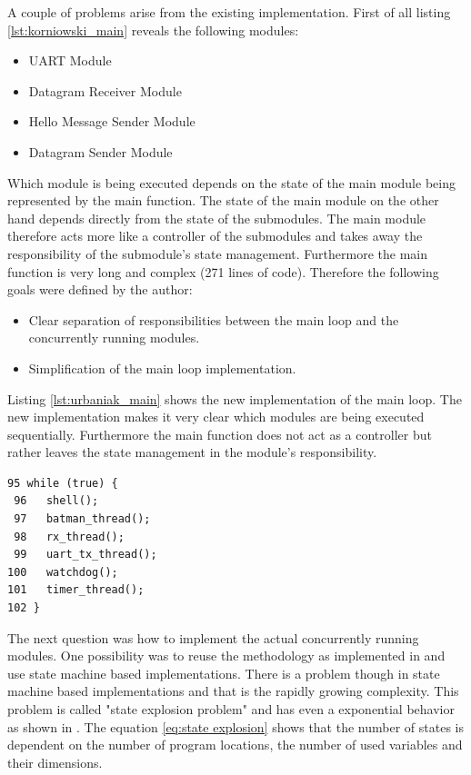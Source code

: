 A couple of problems arise from the existing implementation. First of all listing \ref{lst:korniowski_main} reveals the following modules:

\begin{itemize}
    \item UART Module
    \item Datagram Receiver Module
    \item Hello Message Sender Module
    \item Datagram Sender Module
\end{itemize}

Which module is being executed depends on the state of the main module being represented by the main function. The state of the main module on the other hand depends directly from the state of the submodules. The main module therefore acts more like a controller of the submodules and takes away the responsibility of the submodule's state management. Furthermore the main function is very long and complex (271 lines of code). Therefore the following goals were defined by the author:

\begin{itemize}
    \item Clear separation of responsibilities between the main loop and the concurrently running modules.
    \item Simplification of the main loop implementation.
\end{itemize}

Listing \ref{lst:urbaniak_main} shows the new implementation of the main loop. The new implementation makes it very clear which modules are being executed sequentially. Furthermore the main function does not act as a controller but rather leaves the state management in the module's responsibility.

\begin{lstlisting}[label=lst:urbaniak_main,caption=main function implementation]
 95 while (true) {
 96   shell();
 97   batman_thread();
 98   rx_thread();
 99   uart_tx_thread();
100   watchdog();
101   timer_thread();
102 }
\end{lstlisting}

The next question was how to implement the actual concurrently running modules. One possibility was to reuse the methodology as implemented in \cite{korniowski} and use state machine based implementations. There is a problem though in state machine based implementations and that is the rapidly growing complexity. This problem is called "state explosion problem" and has even a exponential behavior as shown in \cite{katoen}. The equation \ref{eq:state explosion} shows that the number of states is dependent on the number of program locations, the number of used variables and their dimensions.

